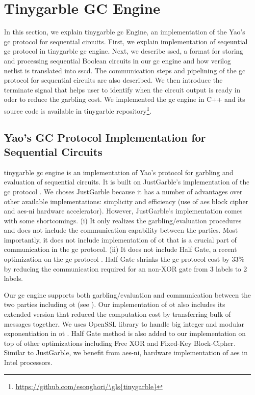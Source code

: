 \chapter{Tinygarble GC Engine}\label{chap:engine}
In this section, we explain \gls{tinygarble} \acrshort{gc} Engine, an implementation of the Yao's \acrshort{gc} protocol for sequential circuits.
First, we explain implementation of seqeuntial \acrshort{gc} protocol in \gls{tinygarble} \acrshort{gc} engine.
Next, we describe \acrfull{sscd}, a format for storing and processing sequential Boolean circuits in our \acrshort{gc} engine and how \gls{verilog} netlist is translated into \acrshort{sscd}.
The communication steps and pipelining of the \acrshort{gc} protocol for sequential circuits are also described.
We then introduce the terminate signal that helps user to identify when the circuit output is ready in oder to reduce the garbling cost.
We implemented the \acrshort{gc} engine in C++ and its source code is available in \gls{tinygarble} repository\footnote{\url{https://github.com/esonghori/\gls{tinygarble}}}.

\section{Yao's GC Protocol Implementation for Sequential Circuits} \label{sec:engine-gc}
\gls{tinygarble} \acrshort{gc} engine is an implementation of Yao's protocol for garbling and evaluation of sequential circuits.
It is built on JustGarble's implementation of the \acrshort{gc} protocol \cite{bellare2013efficient}.
We choses JustGarble because it has a number of advantages over other available implementations: simplicity and efficiency (use of \acrshort{aes} block cipher and \acrshort{aes-ni} hardware accelerator).
However, JustGarble's implementation comes with some shortcomings.
(i) It only realizes the garbling/evaluation procedures and does not include the communication capability between the parties.
Most importantly, it does not include implementation of \acrshort{ot} that is a crucial part of communication in the \acrshort{gc} protocol.
(ii) It does not include Half Gate, a recent optimization on the \acrshort{gc} protocol \cite{zahur2015two}.
Half Gate shrinks the \acrshort{gc} protocol cost by 33\% by reducing the communication required for an non-XOR gate from 3 labels to 2 labels.

Our \acrshort{gc} engine supports both garbling/evaluation and communication between the two parties including \acrshort{ot} (see ).
Our implementation of \acrshort{ot} also includes its extended version \cite{husted2013gpu} that reduced the computation cost by transferring bulk of messages together.
We uses OpenSSL library to handle big integer and modular exponentiation in \acrshort{ot} \cite{viega2002network}.
Half Gate method is also added to our implementation on top of other optimizations including Free XOR and Fixed-Key Block-Cipher.
Similar to JustGarble, we benefit from \acrshort{aes-ni}, hardware implementation of \acrshort{aes} in Intel processors.

